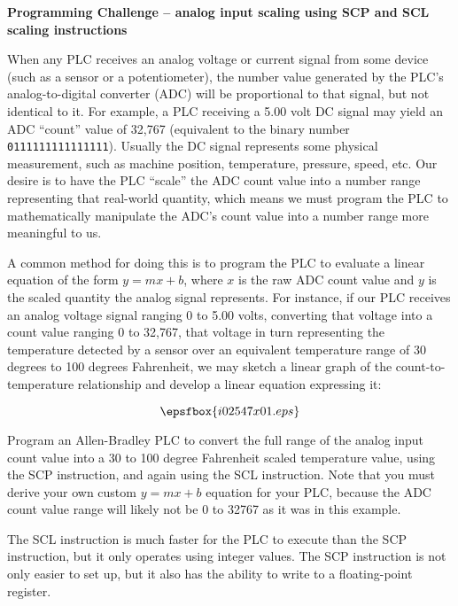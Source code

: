 

\noindent
{\bf Programming Challenge -- analog input scaling using SCP and SCL scaling instructions} 

\vskip 10pt

When any PLC receives an analog voltage or current signal from some device (such as a sensor or a potentiometer), the number value generated by the PLC's analog-to-digital converter (ADC) will be proportional to that signal, but not identical to it.  For example, a PLC receiving a 5.00 volt DC signal may yield an ADC ``count'' value of 32,767 (equivalent to the binary number {\tt 0111111111111111}).  Usually the DC signal represents some physical measurement, such as machine position, temperature, pressure, speed, etc.  Our desire is to have the PLC ``scale'' the ADC count value into a number range representing that real-world quantity, which means we must program the PLC to mathematically manipulate the ADC's count value into a number range more meaningful to us.

\vskip 10pt

A common method for doing this is to program the PLC to evaluate a linear equation of the form $y = mx + b$, where $x$ is the raw ADC count value and $y$ is the scaled quantity the analog signal represents.  For instance, if our PLC receives an analog voltage signal ranging 0 to 5.00 volts, converting that voltage into a count value ranging 0 to 32,767, that voltage in turn representing the temperature detected by a sensor over an equivalent temperature range of 30 degrees to 100 degrees Fahrenheit, we may sketch a linear graph of the count-to-temperature relationship and develop a linear equation expressing it:

$$\epsfbox{i02547x01.eps}$$

Program an Allen-Bradley PLC to convert the full range of the analog input count value into a 30 to 100 degree Fahrenheit scaled temperature value, using the SCP instruction, and again using the SCL instruction.  Note that you must derive your own custom $y = mx + b$ equation for your PLC, because the ADC count value range will likely not be 0 to 32767 as it was in this example.







The SCL instruction is much faster for the PLC to execute than the SCP instruction, but it only operates using integer values.  The SCP instruction is not only easier to set up, but it also has the ability to write to a floating-point register.











